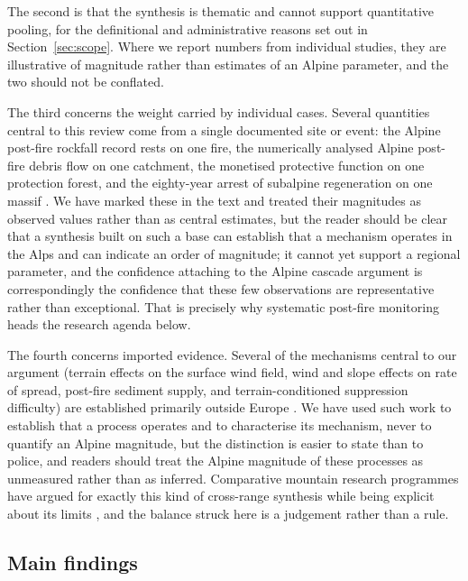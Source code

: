 \documentclass[11pt,a4paper]{article}
\begin{document}
The second is that the synthesis is thematic and cannot support quantitative pooling, for the definitional and administrative reasons set out in Section~\ref{sec:scope}. Where we report numbers from individual studies, they are illustrative of magnitude rather than estimates of an Alpine parameter, and the two should not be conflated.

The third concerns the weight carried by individual cases. Several quantities central to this review come from a single documented site or event: the Alpine post-fire rockfall record rests on one fire, the numerically analysed Alpine post-fire debris flow on one catchment, the monetised protective function on one protection forest, and the eighty-year arrest of subalpine regeneration on one massif \citep{melzner_brief_2019, laporta_postwildfire_2025, moos_climate_2021, degiuli_arrested_2024}. We have marked these in the text and treated their magnitudes as observed values rather than as central estimates, but the reader should be clear that a synthesis built on such a base can establish that a mechanism operates in the Alps and can indicate an order of magnitude; it cannot yet support a regional parameter, and the confidence attaching to the Alpine cascade argument is correspondingly the confidence that these few observations are representative rather than exceptional. That is precisely why systematic post-fire monitoring heads the research agenda below.

The fourth concerns imported evidence. Several of the mechanisms central to our argument (terrain effects on the surface wind field, wind and slope effects on rate of spread, post-fire sediment supply, and terrain-conditioned suppression difficulty) are established primarily outside Europe \citep{sharples_overview_2009, hayajneh_wind_2026, morell_sediment_2021, cardil_assessing_2025}. We have used such work to establish that a process operates and to characterise its mechanism, never to quantify an Alpine magnitude, but the distinction is easier to state than to police, and readers should treat the Alpine magnitude of these processes as unmeasured rather than as inferred. Comparative mountain research programmes have argued for exactly this kind of cross-range synthesis while being explicit about its limits \citep{payne_nature_2020}, and the balance struck here is a judgement rather than a rule.

\subsection{Main findings}
\end{document}
